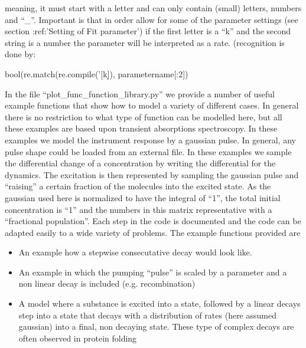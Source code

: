 \documentclass[letterpaper,10pt,english]{sphinxmanual}
\begin{document}
\begin{sphinxVerbatim}[commandchars=\\\{\}]
\PYG{p}{[}\PYG{p}{]}\PYG{p}{[} \PYG{p}{]}
\end{sphinxVerbatim}

meaning, it must start with a letter and can only contain (small) letters,
numbers and “\_”. Important is that in order allow for some of the parameter
settings (see section :ref:’Setting of Fit parameter’) if the first
letter is a “k” and the second string is a number the parameter will be
interpreted as a rate. (recognition is done by:

\begin{sphinxVerbatim}[commandchars=\\\{\}]
bool(re.match(re.compile(’[k]\PYGZsq{}̣), parameter\PYGZus{}name[:2])
\end{sphinxVerbatim}

In the file “plot\_func\_function\_library.py” we provide a number of
useful example functions that show how to model a variety of different
cases. In general there is no restriction to what type of function can
be modelled here, but all these examples are based upon transient
absorptions spectroscopy. In these examples we model the instrument
response by a gaussian pulse. In general, any pulse shape could be
loaded from an external file. In these examples we sample the
differential change of a concentration by writing the differential for
the dynamics. The excitation is then represented by sampling the
gaussian pulse and “raising” a certain fraction of the molecules into
the excited state. As the gaussian used here is normalized to have the
integral of “1”, the total initial concentration is “1” and the numbers
in this matrix representative with a “fractional population”. Each step
in the code is documented and the code can be adapted easily to a wide
variety of problems. The example functions provided are
\begin{itemize}
\item {} 
An example how a stepwise consecutative decay would look like.

\item {} 
An example in which the pumping “pulse” is scaled by a parameter and
a non linear decay is included (e.g. recombination)

\item {} 
A model where a substance is excited into a state, followed by a
linear decays step into a state that decays with a distribution of
rates (here assumed gaussian) into a final, non decaying state. These
type of complex decays are often observed in protein folding

\end{itemize}
\end{document}
